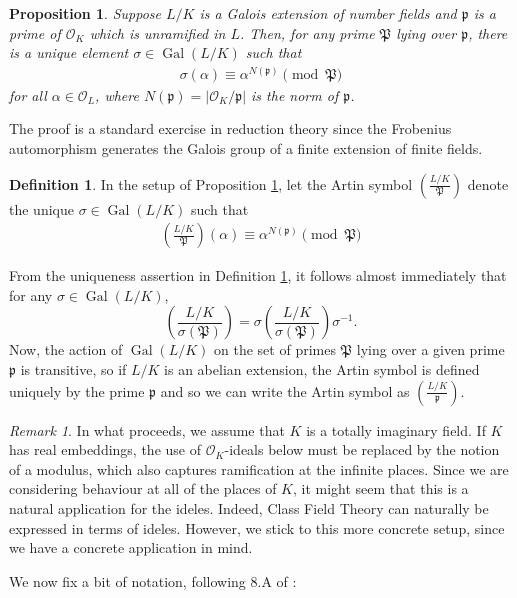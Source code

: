 \documentclass{amsart}
\newtheorem{prop}[thm]{Proposition}
\theoremstyle{definition}
\newtheorem{definition}[thm]{Definition}
\theoremstyle{remark}
\newtheorem{remark}[thm]{Remark}
\numberwithin{equation}{section}
\newcommand{\cO}{\mathcal O}
\newcommand{\fkp}{\mathfrak p}
\newcommand{\fkP}{\mathfrak{P}}
\newcommand{\inv}{^{-1}}
\newcommand{\artin}[2]{\left( \frac{#1}{#2}\right)}
\DeclareMathOperator{\Gal}{Gal}
\begin{document}
 \begin{prop}\label{prop:ArtinSymbol}
 Suppose $L/K$ is a Galois extension of number fields and $\fkp$ is a prime of $\cO_{K}$ which is unramified in $L$. Then, for any prime $\fkP$ lying over $\fkp$, there is a unique element $\sigma \in \Gal(L/K)$ such that 
 \begin{align*}
 \sigma(\alpha) \equiv \alpha^{N(\fkp)} \pmod{\fkP}
 \end{align*}
 for all $\alpha \in \cO_{L}$, where $N(\fkp) = |\cO_{K}/\fkp|$ is the norm of $\fkp$.
 \end{prop}

The proof is a standard exercise in reduction theory since the Frobenius automorphism generates the Galois group of a finite extension of finite fields.

\begin{definition} \label{def:ArtinSymbol1}
In the setup of Proposition \ref{prop:ArtinSymbol}, let the Artin symbol $\artin{L/K}{\fkP}$ denote the unique $\sigma \in \Gal(L/K)$ such that 
 \begin{align*}
 \artin{L/K}{\fkP}(\alpha) \equiv \alpha^{N(\fkp)} \pmod{\fkP}
 \end{align*}
\end{definition}

 From the uniqueness assertion in Definition \ref{def:ArtinSymbol1}, it follows almost immediately that for any $\sigma \in \Gal(L/K)$,
 \[
 \artin{L/K}{\sigma(\fkP)} = \sigma \artin{L/K}{\sigma(\fkP)} \sigma\inv.
 \]
 Now, the action of $\Gal(L/K)$ on the set of primes $\fkP$ lying over a given prime $\fkp$ is transitive, so if $L/K$ is an abelian extension, the Artin symbol is defined uniquely by the prime $\fkp$ and so we can write the Artin symbol as $\artin{L/K}{\fkp}$.
 
 \begin{remark}
 In what proceeds, we assume that $K$ is a totally imaginary field. If $K$ has real embeddings, the use of $\cO_{K}$-ideals below must be replaced by the notion of a modulus, which also captures ramification at the infinite places. Since we are considering behaviour at all of the places of $K$, it might seem that this is a natural application for the ideles. Indeed, Class Field Theory can naturally be expressed in terms of ideles. However, we stick to this more concrete setup, since we have a concrete application in mind.
 \end{remark}

We now fix a bit of notation, following 8.A of \cite{CoxPrimes}:
\end{document}
